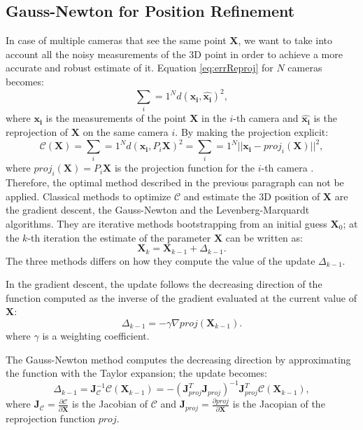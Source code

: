 \subsection{Gauss-Newton for Position Refinement}
In case of multiple cameras that see the same point $\mathbf{X}$, we want to take into account all the noisy measurements of the 3D point in order to achieve a more accurate and robust estimate of it.
Equation \eqref{eq:errReproj} for $N$ cameras becomes:
\begin{equation}
\label{eq:errReprojmulti}
\sum_i=1^N d(\mathbf{x_i}, \hat{\mathbf{x_i}})^2,
\end{equation}
where $\mathbf{x_i}$ is the measurements of the point $\mathbf{X}$ in the $i$-th camera and $\hat{\mathbf{x_i}}$ is the reprojection of $\mathbf{X}$ on the same camera $i$. By making the projection explicit:
\begin{equation}
 \label{eq:errReprojmulti2}
\mathcal{C}(\mathbf{X}) =\sum_i=1^N d(\mathbf{x_i}, P_i\mathbf{X})^2 = \sum_i=1^N ||\mathbf{x_i} - proj_i(\mathbf{X})||^2,
\end{equation}
where $proj_i(\mathbf{X}) = P_i\mathbf{X}$ is the projection function for the $i$-th camera .
Therefore, the optimal method described in the previous paragraph can not be applied.
Classical methods to optimize $\mathcal{C}$ and estimate the 3D position of $\mathbf{X}$ are the gradient descent, the Gauss-Newton and the Levenberg-Marquardt algorithms. 
They are iterative methods bootstrapping from an initial guess $\mathbf{X}_0$; at the $k$-th iteration the estimate of the parameter $\mathbf{X}$ can be written as:
\begin{equation}
  \label{eq:minim}
 \mathbf{X}_k = \mathbf{X}_{k-1} + \Delta_{k-1}.
\end{equation}
The three methods differs on how they compute the value of the update $\Delta_{k-1}$.

In the gradient descent, the update follows the decreasing direction of the function computed as the inverse of the gradient evaluated at the current value of $\mathbf{X}$:
\begin{equation}
  \label{eq:discGrad}
 \Delta_{k-1} = - \gamma \nabla {proj}(\mathbf{X}_{k-1}).
\end{equation}
where $\gamma$ is a weighting coefficient.

The Gauss-Newton method computes the decreasing direction by approximating the function with the Taylor expansion; the update becomes:
\begin{equation}
  \label{eq:gaussN1}
    \Delta_{k-1}  = \mathbf{J}_{\mathcal{C}}^{-1} \mathcal{C}(\mathbf{X}_{k-1}) = - (\mathbf{J}_{proj}^T \mathbf{J}_{proj})^{-1} \mathbf{J}_{proj}^T\mathcal{C}(\mathbf{X}_{k-1}),
\end{equation}
where $\mathbf{J}_{\mathcal{C}}=\frac{\partial \mathcal{C}}{\partial \mathbf{X}}$ is the Jacobian of $\mathcal{C}$ and $\mathbf{J}_{proj}=\frac{\partial proj}{\partial \mathbf{X}}$ is the Jacopian of the reprojection function $proj$.


